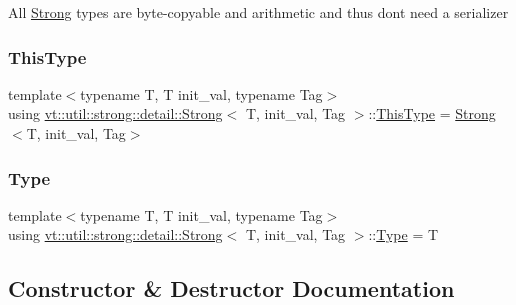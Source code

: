 All {\ttfamily \hyperlink{structvt_1_1util_1_1strong_1_1detail_1_1_strong}{Strong}} types are byte-\/copyable and arithmetic and thus don\textquotesingle{}t need a serializer \mbox{\label{structvt_1_1util_1_1strong_1_1detail_1_1_strong_a510d40741bda362d97a4753919a577dd}} 
\subsubsection{\texorpdfstring{This\+Type}{ThisType}}
{\footnotesize\ttfamily template$<$typename T, T init\+\_\+val, typename Tag$>$ \\
using \hyperlink{structvt_1_1util_1_1strong_1_1detail_1_1_strong}{vt\+::util\+::strong\+::detail\+::\+Strong}$<$ T, init\+\_\+val, Tag $>$\+::\hyperlink{structvt_1_1util_1_1strong_1_1detail_1_1_strong_a510d40741bda362d97a4753919a577dd}{This\+Type} =  \hyperlink{structvt_1_1util_1_1strong_1_1detail_1_1_strong}{Strong}$<$T, init\+\_\+val, Tag$>$}

\mbox{\label{structvt_1_1util_1_1strong_1_1detail_1_1_strong_ab47d63a1c618b3aafd0b30f022fedba7}} 
\subsubsection{\texorpdfstring{Type}{Type}}
{\footnotesize\ttfamily template$<$typename T, T init\+\_\+val, typename Tag$>$ \\
using \hyperlink{structvt_1_1util_1_1strong_1_1detail_1_1_strong}{vt\+::util\+::strong\+::detail\+::\+Strong}$<$ T, init\+\_\+val, Tag $>$\+::\hyperlink{structvt_1_1util_1_1strong_1_1detail_1_1_strong_ab47d63a1c618b3aafd0b30f022fedba7}{Type} =  T}



\subsection{Constructor \& Destructor Documentation}
\mbox{\label{structvt_1_1util_1_1strong_1_1detail_1_1_strong_aacc46aaa7ec00051d3056b7cbd850586}} 

